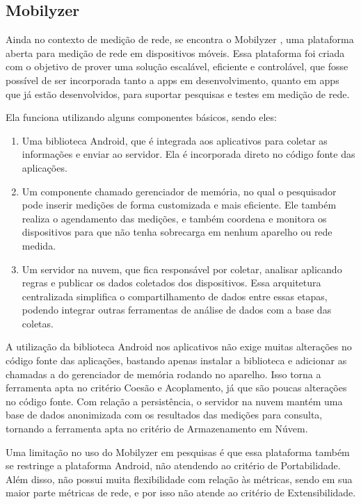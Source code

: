 \documentclass[12pt]{tcc}
\begin{document}
		\subsection{Mobilyzer}
		\par Ainda no contexto de medição de rede, se encontra o Mobilyzer \citep{Nikravesh2015Mobilyzer}, uma plataforma aberta para medição de rede em dispositivos móveis. Essa plataforma foi criada com o objetivo de prover uma solução escalável, eficiente e controlável, que fosse possível de ser incorporada tanto a apps em desenvolvimento, quanto em apps que já estão desenvolvidos, para suportar pesquisas e testes em medição de rede. 
		\par Ela funciona utilizando alguns componentes básicos, sendo eles: 
		\begin{enumerate}
			\item Uma biblioteca Android, que é integrada aos aplicativos para coletar as informações e enviar ao servidor. Ela é incorporada direto no código fonte das aplicações.
			\item Um componente chamado gerenciador de memória, no qual o pesquisador pode inserir medições de forma customizada e mais eficiente. Ele também realiza o agendamento das medições, e também coordena e monitora os dispositivos para que não tenha sobrecarga em nenhum aparelho ou rede medida. 
			\item Um servidor na nuvem, que fica responsável por coletar, analisar aplicando regras e publicar os dados coletados dos dispositivos. Essa arquitetura centralizada simplifica o compartilhamento de dados entre essas etapas, podendo integrar outras ferramentas de análise de dados com a base das coletas.

		\end{enumerate}
		
		A utilização da biblioteca Android nos aplicativos não exige muitas alterações no código fonte das aplicações, bastando apenas instalar a biblioteca e adicionar as chamadas a  do gerenciador de memória rodando no aparelho. Isso torna a ferramenta apta no critério Coesão e Acoplamento, já que são poucas alterações no código fonte. Com relação a persistência, o servidor na nuvem mantém uma base de dados anonimizada com os resultados das medições para consulta, tornando a ferramenta apta no critério de Armazenamento em Núvem.

		Uma limitação no uso do Mobilyzer em pesquisas é que essa plataforma também se restringe a plataforma Android, não atendendo ao critério de Portabilidade. Além disso, não possui muita flexibilidade com relação às métricas, sendo em sua maior parte métricas de rede, e por isso não atende ao critério de Extensibilidade.
\end{document}
